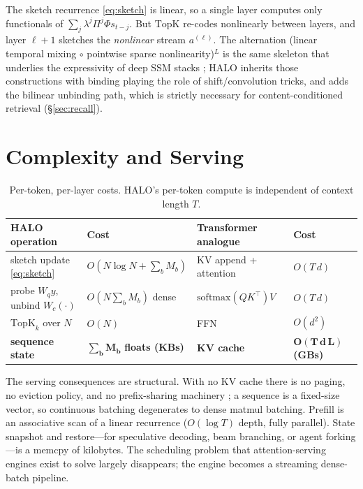 \documentclass[11pt]{article}
\newcommand{\topk}{\mathrm{TopK}}
\begin{document}
The sketch recurrence \eqref{eq:sketch} is linear, so a single layer computes only functionals of $\sum_j \lambda^{j}\Pi^{j}\Phi s_{t-j}$. But $\topk$ re-codes nonlinearly between layers, and layer $\ell{+}1$ sketches the \emph{nonlinear} stream $a^{(\ell)}$. The alternation (linear temporal mixing $\circ$ pointwise sparse nonlinearity)$^L$ is the same skeleton that underlies the expressivity of deep SSM stacks \citep{gu2022s4,gu2023mamba}; HALO inherits those constructions with binding playing the role of shift/convolution tricks, and adds the bilinear unbinding path, which is strictly necessary for content-conditioned retrieval (\S\ref{sec:recall}).

\section{Complexity and Serving}
\label{sec:serving}

\begin{table}[h]
\centering
\small
\begin{tabular}{llll}
\toprule
\textbf{HALO operation} & \textbf{Cost} & \textbf{Transformer analogue} & \textbf{Cost} \\
\midrule
sketch update \eqref{eq:sketch} & $O(N\log N + \sum_b M_b)$ & KV append + attention & $O(T\,d)$ \\
probe $W_q y$, unbind $W_c(\cdot)$ & $O(N \sum_b M_b)$ dense & $\mathrm{softmax}(QK^\top)V$ & $O(T\,d)$ \\
$\topk_k$ over $N$ & $O(N)$ & FFN & $O(d^2)$ \\
\textbf{sequence state} & $\boldsymbol{\sum_b M_b}$ \textbf{floats (KBs)} & \textbf{KV cache} & $\boldsymbol{O(T\,d\,L)}$ \textbf{(GBs)} \\
\bottomrule
\end{tabular}
\caption{Per-token, per-layer costs. HALO's per-token compute is independent of context length $T$.}
\label{tab:complexity}
\end{table}

The serving consequences are structural. With no KV cache there is no paging, no eviction policy, and no prefix-sharing machinery \citep{kwon2023pagedattention}; a sequence is a fixed-size vector, so continuous batching degenerates to dense matmul batching. Prefill is an associative scan of a linear recurrence ($O(\log T)$ depth, fully parallel). State snapshot and restore---for speculative decoding, beam branching, or agent forking---is a memcpy of kilobytes. The scheduling problem that attention-serving engines exist to solve largely disappears; the engine becomes a streaming dense-batch pipeline.
\end{document}
